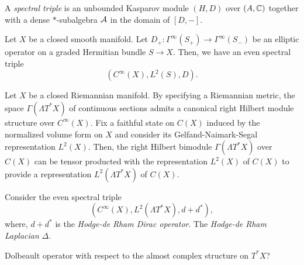 \documentclass{../../large}
\begin{document}
\begin{prb}
A \emph{spectral triple} is an unbounded Kasparov module $(H,D)$ over $(A,\mathbb{C})$ together with a dense $*$-subalgebra $\mathcal{A}$ in the domain of $[D,-]$.
\end{prb}

\begin{prb}
Let $X$ be a closed smooth manifold.
Let $D_+:\Gamma^\infty(S_+)\to\Gamma^\infty(S_-)$ be an elliptic operator on a graded Hermitian bundle $S\to X$.
Then, we have an even spectral triple
\[(C^\infty(X),L^2(S),D).\]
\end{prb}


\begin{prb}
Let $X$ be a closed Riemannian manifold.
By specifying a Riemannian metric, the space $\Gamma(\Lambda T^*X)$ of continuous sections admits a canonical right Hilbert module structure over $C^\infty(X)$.
Fix a faithful state on $C(X)$ induced by the normalized volume form on $X$ and consider its Gelfand-Naimark-Segal representation $L^2(X)$.
Then, the right Hilbert bimodule $\Gamma(\Lambda T^*X)$ over $C(X)$ can be tensor producted with the representation $L^2(X)$ of $C(X)$ to provide a representation $L^2(\Lambda T^*X)$ of $C(X)$.

Consider the even spectral triple
\[(C^\infty(X),L^2(\Lambda T^*X),d+d^*),\]
where, $d+d^*$ is the \emph{Hodge-de Rham Dirac operator}.
The \emph{Hodge-de Rham Laplacian} $\Delta$.

Dolbeault operator with respect to the almost complex structure on $T^*X$?
\end{prb}


\begin{prb}
\end{prb}

\begin{prb}
\end{prb}

\begin{prb}
\end{prb}







\section{}
\end{document}
